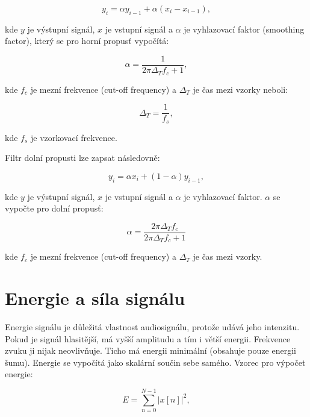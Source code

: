 \begin{equation}
	y_i=\alpha y_{i-1} + \alpha (x_i-x_{i-1}),
	\label{highpass}
\end{equation}

kde $y$ je výstupní signál, $x$ je vstupní signál a $\alpha$ je vyhlazovací faktor (smoothing factor), který se pro horní propusť vypočítá:

\begin{equation}
	\alpha=\frac{1}{2 \pi \Delta_T f_c + 1},
	\label{alphahigh}
\end{equation}

kde $f_c$ je mezní frekvence (cut-off frequency) a $\Delta_T$ je čas mezi vzorky neboli:

\begin{equation}
	\label{deltat}
	\Delta_T=\frac{1}{f_s},
\end{equation}

kde $f_s$ je vzorkovací frekvence.

Filtr dolní propusti lze zapsat následovně:

\begin{equation}
	y_i=\alpha x_i + (1 - \alpha) y_{i-1},
	\label{lowpass}
\end{equation}

kde $y$ je výstupní signál, $x$ je vstupní signál a $\alpha$ je vyhlazovací faktor. $\alpha$ se vypočte pro dolní propusť:

\begin{equation}
	\alpha=\frac{2 \pi \Delta_T f_c}{2 \pi \Delta_T f_c + 1}
	\label{alphalow}
\end{equation}

kde $f_c$ je mezní frekvence (cut-off frequency) a $\Delta_T$ je čas mezi vzorky.

\section{Energie a síla signálu}

Energie signálu je důležitá vlastnost audiosignálu, protože udává jeho intenzitu. Pokud je signál hlasitější, má vyšší amplitudu a tím i větší energii. Frekvence zvuku ji nijak neovlivňuje. Ticho má energii minimální (obsahuje pouze energii šumu). Energie se vypočítá jako skalární součin sebe samého. Vzorec pro výpočet energie:

\begin{equation}
	E=\sum_{n=0}^{N-1}|x[n]|^2,
	\label{energie}
\end{equation}

